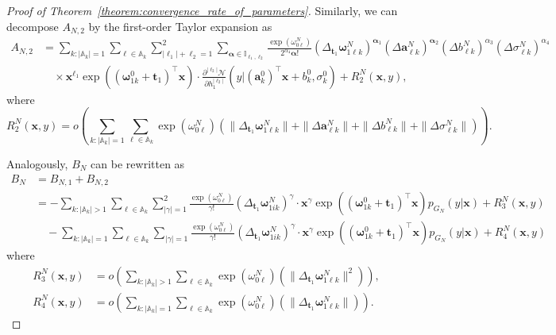 \documentclass[twoside]{article}
\theoremstyle{plain}
\theoremstyle{definition}
\theoremstyle{plain}
\def\valpha{{\bm{\alpha}}}
\def\vomega{{\bm{\omega}}}
\def\vell{{\bm{\ell}}}
\def\va{{\bm{a}}}
\def\vt{{\bm{t}}}
\def\vx{{\bm{x}}}
\def\sA{{\mathbb{A}}}
\def\sI{{\mathbb{I}}}
\begin{document}
\begin{proof}[Proof of Theorem~\ref{theorem:convergence_rate_of_parameters}]
Similarly, we can decompose $A_{N, 2}$ by the first-order Taylor expansion as
\begin{align*}
    A_{N, 2} &= \sum_{k : |\sA_k| = 1} \sum_{\ell \in \sA_k} \sum_{\left|\vell_{1}\right|+\ell_{2}=1}^{2} 
\sum_{\valpha \in \sI_{\ell_1, \ell_2}} \frac{\exp{(\omega_{0 \ell}^N)}}{2^{\alpha_4} \valpha!} (\Delta_{\vt_1} \vomega_{1\ell k}^N)^{\valpha_1} (\Delta \va_{\ell k}^N)^{\valpha_2} (\Delta b_{\ell k}^N)^{\alpha_3} (\Delta \sigma_{\ell k}^N)^{\alpha_4} \\
    &\quad \times \vx^{\vell_1} \exp{\left( (\vomega_{1k}^0 + \vt_1)^{\top} \vx \right)} \cdot \frac{\partial^{|\ell_2|} \mathcal{N}}{\partial h_1^{|\ell_2|}} (y | (\va_k^0)^{\top} \vx + b_k^0, \sigma_k^0) + R^N_2 (\vx, y),
\end{align*}
where $$R_2^N (\vx, y) = o \left( \sum_{k : |\sA_k| = 1} \sum_{\ell \in \sA_{k}} \exp(\omega_{0\ell}^N) (\|\Delta_{\vt_1} \vomega_{1\ell k}^N \| + \| \Delta \va_{\ell k}^N \| + \| \Delta b_{\ell k}^N \| + \| \Delta \sigma_{\ell k}^N \|) \right).$$

Analogously, $B_N$ can be rewritten as 
\begin{align*}
    B_N &= B_{N, 1} + B_{N, 2} \\
    &= - \sum_{k : |\sA_k| > 1} \sum_{\ell \in \sA_k} \sum_{|\gamma|=1}^{2} 
\frac{\exp\left(\omega_{0 \ell}^{N}\right)}{\gamma!}
\left(\Delta_{\vt_1} \vomega_{1 i k}^{N}\right)^{\gamma} \cdot \vx^{\gamma} 
\exp \left(\left(\vomega_{1 k}^{0}+\vt_1\right)^{\top} \vx\right) 
p_{G_{N}}(y | \vx)
+ R^N_{3}(\vx, y) \\
&\quad - \sum_{k : |\sA_k| = 1} \sum_{\ell \in \sA_k} \sum_{|\gamma|=1} 
\frac{\exp\left(\omega_{0 \ell}^{N}\right)}{\gamma!}
\left(\Delta_{\vt_1} \vomega_{1 i k}^{N}\right)^{\gamma} \cdot \vx^{\gamma} 
\exp \left(\left(\vomega_{1 k}^{0}+\vt_1\right)^{\top} \vx\right) 
p_{G_{N}}(y | \vx)
+ R^N_{4}(\vx, y)
\end{align*}
where 
\begin{align*}
    R_3^N (\vx, y) &= o \left( \sum_{k : |\sA_k| > 1} \sum_{\ell \in \sA_{k}} \exp(\omega_{0\ell}^N) (\|\Delta_{\vt_1} \vomega_{1\ell k}^N \|^{2}) \right), \\
    R_4^N (\vx, y) &= o \left( \sum_{k : |\sA_k| = 1} \sum_{\ell \in \sA_{k}} \exp(\omega_{0\ell}^N) (\|\Delta_{\vt_1} \vomega_{1\ell k}^N \|) \right).
\end{align*}


\end{proof}
\end{document}
